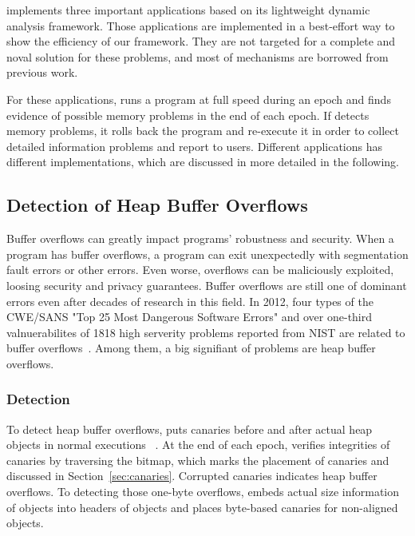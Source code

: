 \label{sec:applications}

\doubletake{} implements three important applications based on its lightweight 
dynamic analysis framework. 
Those applications are implemented in a best-effort way to show the efficiency of our framework.
They are not targeted for a complete and noval solution for these problems, and most of
mechanisms are borrowed from previous work. 

For these applications, \doubletake{} runs a program at full speed during an epoch and 
finds evidence of possible memory problems in the end of each epoch. 
If \doubletake{} detects memory problems, it rolls back the program and re-execute it 
in order to collect detailed information problems and report to users. 
Different applications has different implementations, which are discussed in more detailed 
in the following. 

\subsection{Detection of Heap Buffer Overflows}
\label{sec:overflow}
Buffer overflows can greatly impact programs' robustness and security. When a program has 
buffer overflows, a program can exit unexpectedly with segmentation fault errors or other errors. 
Even worse, overflows can be maliciously exploited, loosing security and privacy guarantees. 
Buffer overflows are still one of dominant errors even after decades of research in this field.
In 2012, four types of the CWE/SANS "Top 25 Most Dangerous Software Errors" and 
over one-third valnuerabilites of 1818 high serverity problems reported from 
NIST are related to buffer overflows~\cite{overflows1, overflows2, overflow:lbc}. 
Among them, a big signifiant of problems are heap buffer overflows. 

\subsubsection{Detection}
To detect heap buffer overflows, \DoubleTake{} puts canaries before and after actual heap 
objects in normal executions ~\cite{overflow:lbc, AddressSanitizer}. 
At the end of each epoch, \doubletake{} verifies integrities of canaries by traversing 
the bitmap, which marks the placement of canaries and discussed in Section~\ref{sec:canaries}.  
Corrupted canaries indicates heap buffer overflows. 
To detecting those one-byte overflows, \doubletake{} embeds actual size information of objects 
into headers of objects and places byte-based canaries for non-aligned objects.

